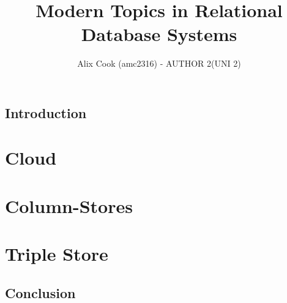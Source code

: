 \documentclass[11pt]{article}
\author{Alix Cook (amc2316) - AUTHOR 2(UNI 2)}
\title{Modern Topics in Relational Database Systems}
\begin{document}
\setlength{\parskip}{.1 in}

\maketitle
\newpage

\subsection*{Introduction}

%
%

\section*{Cloud}
 \newpage

\section*{Column-Stores}
 \newpage

\section*{Triple Store}
 \newpage

\subsection*{Conclusion}
%
%


\end{document}
